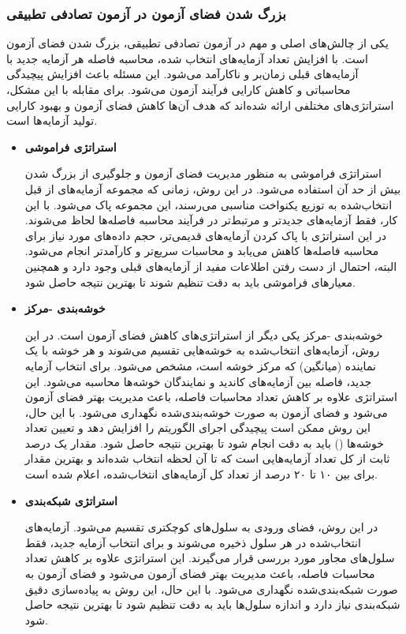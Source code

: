 \subsubsection{بزرگ شدن فضای آزمون در آزمون تصادفی تطبیقی}
یکی از چالش‌های اصلی و مهم در آزمون تصادفی تطبیقی، بزرگ شدن فضای آزمون است. با افزایش تعداد آزمایه‌های انتخاب شده، محاسبه فاصله هر آزمایه جدید با آزمایه‌های قبلی زمان‌بر و ناکارآمد می‌شود. این مسئله باعث افزایش پیچیدگی محاسباتی و کاهش کارایی فرآیند آزمون می‌شود. برای مقابله با این مشکل، استراتژی‌های مختلفی ارائه شده‌اند که هدف آن‌ها کاهش فضای آزمون و بهبود کارایی تولید آزمایه‌ها است.
\begin{itemize}
	\item \textbf{استراتژی فراموشی}
	
	 استراتژی فراموشی \cite{chan2006forgetting}\cite{mao2017out} به منظور مدیریت فضای آزمون و جلوگیری از بزرگ شدن بیش از حد آن استفاده می‌شود. در این روش، زمانی که مجموعه آزمایه‌های از قبل انتخاب‌شده به توزیع یکنواخت مناسبی می‌رسند، این مجموعه پاک می‌شود. با این کار، فقط آزمایه‌های جدیدتر و مرتبط‌تر در فرآیند محاسبه فاصله‌ها لحاظ می‌شوند. در این استراتژی با پاک کردن آزمایه‌های قدیمی‌تر، حجم داده‌های مورد نیاز برای محاسبه فاصله‌ها کاهش می‌یابد و محاسبات سریع‌تر و کارآمدتر انجام می‌شود. البته، احتمال از دست رفتن اطلاعات مفید از آزمایه‌های قبلی وجود دارد و همچنین معیارهای فراموشی باید به دقت تنظیم شوند تا بهترین نتیجه حاصل شود.
	
	\item \textbf{خوشه‌بندی -مرکز}
	
	 خوشه‌بندی -مرکز \cite{burkardt2009k} یکی دیگر از استراتژی‌های کاهش فضای آزمون است. در این روش\cite{chen2021novel}، آزمایه‌های انتخاب‌شده به خوشه‌هایی تقسیم می‌شوند و هر خوشه با یک نماینده (میانگین) که مرکز خوشه است، مشخص می‌شود. برای انتخاب آزمایه جدید، فاصله بین آزمایه‌های کاندید و نمایندگان خوشه‌ها محاسبه می‌شود. این استراتژی علاوه بر کاهش تعداد محاسبات فاصله، باعث مدیریت بهتر فضای آزمون می‌شود و فضای آزمون به صورت خوشه‌بندی‌شده نگهداری می‌شود. با این حال، این روش ممکن است پیچیدگی اجرای الگوریتم را افزایش دهد و تعیین تعداد خوشه‌ها () باید به دقت انجام شود تا بهترین نتیجه حاصل شود.
	مقدار  یک درصد ثابت از کل تعداد آزمایه‌هایی است که تا آن لحظه انتخاب شده‌اند و بهترین مقدار برای  بین ۱۰ تا ۲۰ درصد از تعداد کل آزمایه‌های انتخاب‌شده، اعلام شده است.
	
	\item \textbf{استراتژی شبکه‌بندی}
	
	 در این روش\cite{chow2013art}، فضای ورودی به سلول‌های کوچکتری تقسیم می‌شود. آزمایه‌های انتخاب‌شده در هر سلول ذخیره می‌شوند و برای انتخاب آزمایه جدید، فقط سلول‌های مجاور مورد بررسی قرار می‌گیرند. این استراتژی علاوه بر کاهش تعداد محاسبات فاصله، باعث مدیریت بهتر فضای آزمون می‌شود و فضای آزمون به صورت شبکه‌بندی‌شده نگهداری می‌شود. با این حال، این روش به پیاده‌سازی دقیق شبکه‌بندی نیاز دارد و اندازه سلول‌ها باید به دقت تنظیم شود تا بهترین نتیجه حاصل شود.

\end{itemize}


